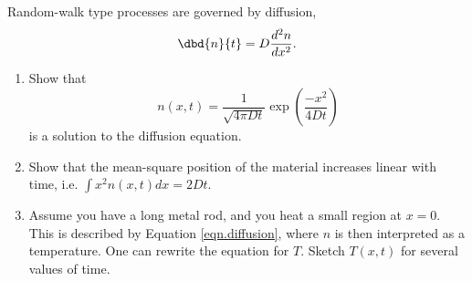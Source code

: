 
   Random-walk type processes are governed by diffusion,
   \begin{align}
	   \dbd{n}{t} = D \frac{d^2 n}{d x^2}.\label{eqn.diffusion}
   \end{align}
      \begin{enumerate}
          \item {} Show that $$n(x,t) = \frac{1}{\sqrt{4 \pi D t}}\exp{\left(\frac{-x^2}{4 D
              t}\right)}$$ is a solution to the diffusion equation.  
          \item {} Show that the mean-square position of the material
              increases linear with time, i.e.  $\int x^2
              n(x,t) dx = 2 D t$.  
      \item {} Assume you have a long metal rod, and you heat a small
	      region at $x=0$.  This is described by Equation
	      \ref{eqn.diffusion}, where $n$ is then interpreted as a
	      temperature.  One can rewrite the equation for $T$.  Sketch
	      $T(x,t)$ for several values of time.
      \end{enumerate}


